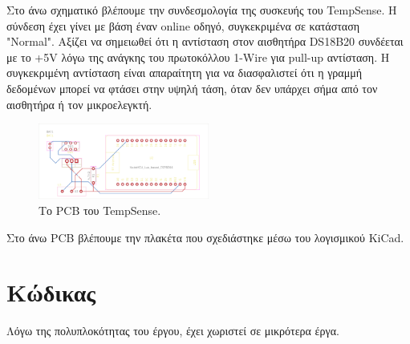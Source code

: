 \documentclass[conference]{IEEEtran}
\begin{document}
Στο άνω σχηματικό βλέπουμε την συνδεσμολογία της συσκευής του TempSense. Η σύνδεση έχει γίνει με βάση έναν online οδηγό, συγκεκριμένα σε κατάσταση "Normal". \cite{mq6connect} Αξίζει να σημειωθεί ότι η αντίσταση στον αισθητήρα DS18B20 συνδέεται με το +5V λόγω της ανάγκης του πρωτοκόλλου 1-Wire για pull-up αντίσταση. Η συγκεκριμένη αντίσταση είναι απαραίτητη για να διασφαλιστεί ότι η γραμμή δεδομένων μπορεί να φτάσει στην υψηλή τάση, όταν δεν υπάρχει σήμα από τον αισθητήρα ή τον μικροελεγκτή. \cite{ds18b20connect}

\begin{figure}[H]
	\colorbox{PineGreen}{\centerline{\includegraphics[width=0.5\textwidth]{assets/TempSense-brd}}}
	\caption{Το PCB του TempSense.}
	\label{Το PCB του TempSense.}
\end{figure}

Στο άνω PCB βλέπουμε την πλακέτα που σχεδιάστηκε μέσω του λογισμικού KiCad.

\section{Κώδικας}
Λόγω της πολυπλοκότητας του έργου, έχει χωριστεί σε μικρότερα έργα.
\end{document}
